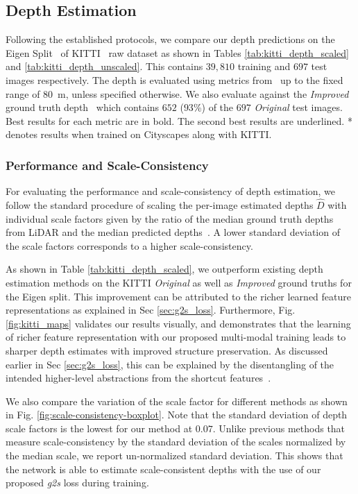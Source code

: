 \subsection{Depth Estimation}
Following the established protocols, we compare our depth predictions on the Eigen Split~\cite{eigen2014depth} of KITTI~\cite{geiger2013vision} raw dataset as shown in Tables \ref{tab:kitti_depth_scaled} and \ref{tab:kitti_depth_unscaled}. This contains $39,810$ training
and $697$ test images respectively. The depth is evaluated using metrics from~\cite{eigen2014depth} up to the fixed range of \SI{80}{m}, unless specified otherwise. 
We also evaluate against the \textit{Improved} ground truth depth~\cite{Uhrig2017THREEDV} which contains $652$ ($93$\%) of the $697$ \textit{Original} test images. 
Best results for each metric are in bold. The second best results are underlined. * denotes results when trained on Cityscapes along with KITTI. 






\subsubsection{Performance and Scale-Consistency}
\label{sec:expt-scale-consistency}
For evaluating the performance and scale-consistency of depth estimation, we follow the standard procedure of scaling the per-image estimated depths $\hat{D}$ with individual scale factors given by the ratio of the median ground truth depths from LiDAR and the median predicted depths~\cite{zhou2017unsupervised}. A lower standard deviation of the scale factors corresponds to a higher scale-consistency. 


As shown in Table \ref{tab:kitti_depth_scaled}, we outperform existing depth estimation methods on the KITTI \textit{Original} as well as \textit{Improved} ground truths for the Eigen split. This improvement can be attributed to the richer learned feature representations as explained in  Sec \ref{sec:g2s_loss}.
Furthermore, Fig. \ref{fig:kitti_maps} validates our results visually, and demonstrates that the learning of richer feature representation with our proposed multi-modal training leads to sharper depth estimates with improved structure preservation. As discussed earlier in Sec \ref{sec:g2s_loss}, this can be explained by the disentangling of the intended higher-level abstractions from the shortcut features~\cite{ramachandram2017deep,jo2017measuring,geirhos2020shortcut}. 

We also compare the variation of the scale factor 
for different methods as shown in Fig. \ref{fig:scale-consistency-boxplot}. Note that the standard deviation of depth scale factors is the lowest for our method at $0.07$. Unlike previous methods that measure scale-consistency by the standard deviation of the scales normalized by the median scale, we report un-normalized standard deviation.  This shows that the network is able to estimate scale-consistent depths with the use of our proposed \textit{g2s} loss during training.

